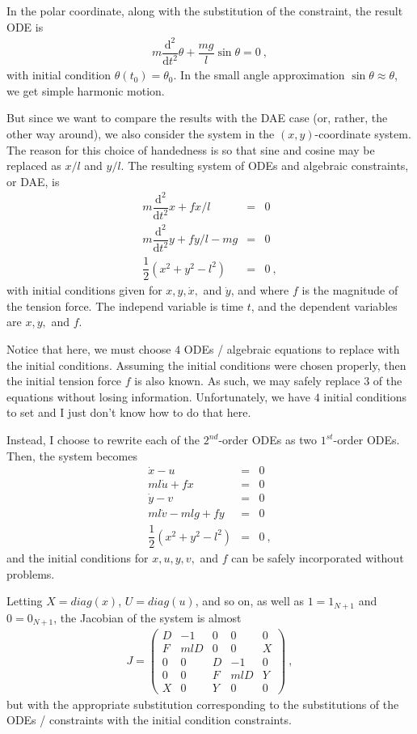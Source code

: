 \documentclass[11pt]{amsdtx}
\newcommand{\ud}{\mathrm{d}}
\begin{document}
In the polar coordinate, along with the substitution of the constraint, the result ODE is
\begin{eqnarray} \label{eq:func_ode}
	m \dfrac{\ud^2}{\ud t^2} \theta + \dfrac{m g}{l} \sin \theta = 0~,
\end{eqnarray}
with initial condition $\theta(t_0) = \theta_0$.  In the small angle approximation $\sin \theta \approx \theta$, we get simple harmonic motion.

But since we want to compare the results with the DAE case (or, rather, the other way around), we also consider the system in the $(x, y)$-coordinate system.  The reason for this choice of handedness is so that sine and cosine may be replaced as $x/l$ and $y/l$.  The resulting system of ODEs and algebraic constraints, or DAE, is
\begin{eqnarray}
	m \dfrac{\ud^2}{\ud t^2} x + fx/l &=& 0\\
	m \dfrac{\ud^2}{\ud t^2} y + fy/l - mg &=&  0\\
	\dfrac{1}{2} \left( x^2 + y^2 - l^2 \right) &=& 0~,
\end{eqnarray}
with initial conditions given for $x, y, \dot{x},$ and $\dot{y}$, and where $f$ is the magnitude of the tension force.  The independ variable is time $t$, and the dependent variables are $x, y,$ and $f$.

Notice that here, we must choose $4$ ODEs / algebraic equations to replace with the initial conditions.  Assuming the initial conditions were chosen properly, then the initial tension force $f$ is also known.  As such, we may safely replace $3$ of the equations without losing information.  Unfortunately, we have $4$ initial conditions to set and I just don't know how to do that here.

Instead, I choose to rewrite each of the $2^{nd}$-order ODEs as two $1^{st}$-order ODEs.  Then, the system becomes
\begin{eqnarray} \label{eq:func_dae}
	\dot{x} - u &=& 0 \\
	ml\dot{u} + fx &=& 0 \\
	\dot{y} - v &=& 0 \\
	ml \dot{v} - mlg + fy &=& 0 \\
	\dfrac{1}{2} \left( x^2 + y^2 - l^2 \right) &=& 0~,
\end{eqnarray}
and the initial conditions for $x, u, y, v,$ and $f$ can be safely incorporated without problems.

Letting $X = diag(x)$, $U = diag(u)$, and so on, as well as $1 = 1_{N+1}$ and $0 = 0_{N+1}$, the Jacobian of the system is almost
\begin{eqnarray} \label{eq:jacobian_dae}
	J = \begin{pmatrix}
		D & -1 & 0 & 0 & 0 \\
		F & mlD & 0 & 0 & X \\
		0 & 0 & D & -1 & 0 \\
		0 & 0 & F & mlD & Y \\
		X & 0 & Y & 0 & 0
	\end{pmatrix}~,
\end{eqnarray}
but with the appropriate substitution corresponding to the substitutions of the ODEs / constraints with the initial condition constraints.
\end{document}
